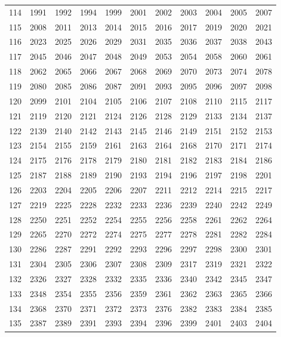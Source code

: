 \begin{longtable}{|r|rrrrrrrrrr|}
  114 & 1991 & 1992 & 1994 & 1999 & 2001 & 2002 & 2003 & 2004 & 2005 & 2007 \\ 
  115 & 2008 & 2011 & 2013 & 2014 & 2015 & 2016 & 2017 & 2019 & 2020 & 2021 \\ 
  116 & 2023 & 2025 & 2026 & 2029 & 2031 & 2035 & 2036 & 2037 & 2038 & 2043 \\ 
  117 & 2045 & 2046 & 2047 & 2048 & 2049 & 2053 & 2054 & 2058 & 2060 & 2061 \\ 
  118 & 2062 & 2065 & 2066 & 2067 & 2068 & 2069 & 2070 & 2073 & 2074 & 2078 \\ 
  119 & 2080 & 2085 & 2086 & 2087 & 2091 & 2093 & 2095 & 2096 & 2097 & 2098 \\ 
  120 & 2099 & 2101 & 2104 & 2105 & 2106 & 2107 & 2108 & 2110 & 2115 & 2117 \\ 
  121 & 2119 & 2120 & 2121 & 2124 & 2126 & 2128 & 2129 & 2133 & 2134 & 2137 \\ 
  122 & 2139 & 2140 & 2142 & 2143 & 2145 & 2146 & 2149 & 2151 & 2152 & 2153 \\ 
  123 & 2154 & 2155 & 2159 & 2161 & 2163 & 2164 & 2168 & 2170 & 2171 & 2174 \\ 
  124 & 2175 & 2176 & 2178 & 2179 & 2180 & 2181 & 2182 & 2183 & 2184 & 2186 \\ 
  125 & 2187 & 2188 & 2189 & 2190 & 2193 & 2194 & 2196 & 2197 & 2198 & 2201 \\ 
  126 & 2203 & 2204 & 2205 & 2206 & 2207 & 2211 & 2212 & 2214 & 2215 & 2217 \\ 
  127 & 2219 & 2225 & 2228 & 2232 & 2233 & 2236 & 2239 & 2240 & 2242 & 2249 \\ 
  128 & 2250 & 2251 & 2252 & 2254 & 2255 & 2256 & 2258 & 2261 & 2262 & 2264 \\ 
  129 & 2265 & 2270 & 2272 & 2274 & 2275 & 2277 & 2278 & 2281 & 2282 & 2284 \\ 
  130 & 2286 & 2287 & 2291 & 2292 & 2293 & 2296 & 2297 & 2298 & 2300 & 2301 \\ 
  131 & 2304 & 2305 & 2306 & 2307 & 2308 & 2309 & 2317 & 2319 & 2321 & 2322 \\ 
  132 & 2326 & 2327 & 2328 & 2332 & 2335 & 2336 & 2340 & 2342 & 2345 & 2347 \\ 
  133 & 2348 & 2354 & 2355 & 2356 & 2359 & 2361 & 2362 & 2363 & 2365 & 2366 \\ 
  134 & 2368 & 2370 & 2371 & 2372 & 2373 & 2376 & 2382 & 2383 & 2384 & 2385 \\ 
  135 & 2387 & 2389 & 2391 & 2393 & 2394 & 2396 & 2399 & 2401 & 2403 & 2404 \\ 

\end{longtable}

